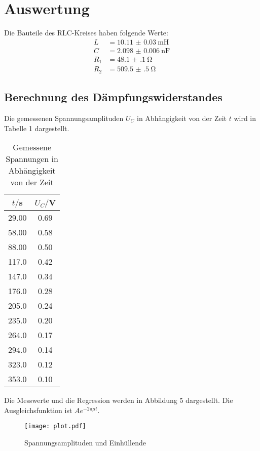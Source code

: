 \section{Auswertung}
\label{sec:Auswertung}

Die Bauteile des RLC-Kreises haben folgende Werte:
\begin{align*}
  L &= \SI{10.11(3)}{\milli\henry} \\
  C &= \SI{2.098(6)}{\nano\farad} \\
  R_1 &= \SI{48.1(1)}{\ohm} \\
  R_2 &= \SI{509.5(5)}{\ohm}
\end{align*}

\subsection{Berechnung des Dämpfungswiderstandes}

Die gemessenen Spannungsamplituden $U_C$ in Abhängigkeit von der Zeit $t$ wird in Tabelle 1 dargestellt.

\begin{table}[H]
  \centering
  \caption{Gemessene Spannungen in Abhängigkeit von der Zeit}
  \label{tab:Spannungsamplitude}
  \begin{tabular}{c c}
    \toprule
    $t/$s & $U_C/$V \\
    \midrule
    29.00 & 0.69 \\
    58.00 & 0.58 \\
    88.00 & 0.50 \\
    117.0 & 0.42 \\
    147.0 & 0.34 \\
    176.0 & 0.28 \\
    205.0 & 0.24 \\
    235.0 & 0.20 \\
    264.0 & 0.17 \\
    294.0 & 0.14 \\
    323.0 & 0.12 \\
    353.0 & 0.10 \\
    \bottomrule
  \end{tabular}
\end{table}

Die Messwerte und die Regression werden in Abbildung 5 dargestellt. Die Ausgleichsfunktion ist $Ae^{-2\pi \mu t}$.

\begin{figure}[H]
  \centering
  \texttt{[image: plot.pdf]}
  \caption{Spannungsamplituden und Einhüllende}
  \label{fig:plot}
\end{figure}

